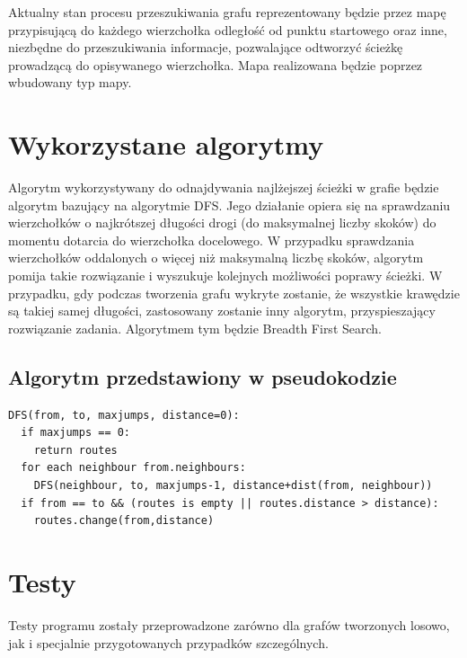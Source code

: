 \documentclass[a4paper, 12pt]{article}
\begin{document}
	Aktualny stan procesu przeszukiwania grafu reprezentowany będzie przez mapę przypisującą do każdego wierzchołka odległość od punktu startowego oraz inne, niezbędne do przeszukiwania informacje, pozwalające odtworzyć ścieżkę prowadzącą do opisywanego wierzchołka.
	Mapa realizowana będzie poprzez wbudowany typ mapy.
	
	\section{Wykorzystane algorytmy}
	Algorytm wykorzystywany do odnajdywania najlżejszej ścieżki w grafie będzie algorytm bazujący na algorytmie DFS. Jego działanie opiera się na sprawdzaniu wierzchołków o najkrótszej długości drogi (do maksymalnej liczby skoków) do momentu dotarcia do wierzchołka docelowego.
	W przypadku sprawdzania wierzchołków oddalonych o więcej niż maksymalną liczbę skoków, algorytm pomija takie rozwiązanie i wyszukuje kolejnych możliwości poprawy ścieżki.
	W przypadku, gdy podczas tworzenia grafu wykryte zostanie, że wszystkie krawędzie są takiej samej długości, zastosowany zostanie inny algorytm, przyspieszający rozwiązanie zadania. Algorytmem tym będzie Breadth First Search.
	\subsection{Algorytm przedstawiony w pseudokodzie}
	\begin{verbatim}
DFS(from, to, maxjumps, distance=0):
  if maxjumps == 0:
    return routes
  for each neighbour from.neighbours:
    DFS(neighbour, to, maxjumps-1, distance+dist(from, neighbour))
  if from == to && (routes is empty || routes.distance > distance):
    routes.change(from,distance)  			
	\end{verbatim}
	
	\section{Testy}
	Testy programu zostały przeprowadzone zarówno dla grafów tworzonych losowo, jak i specjalnie przygotowanych przypadków szczególnych.
\end{document}
